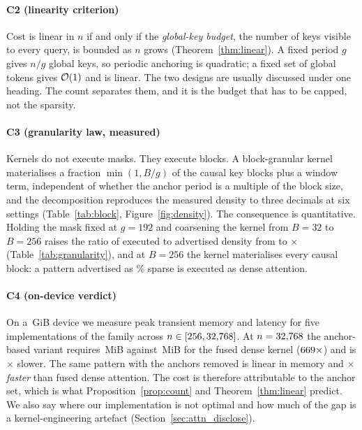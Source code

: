 \paragraph{C2 (linearity criterion)} Cost is linear in $n$ if and only if the
\emph{global-key budget}, the number of keys visible to every query, is bounded
as $n$ grows (Theorem~\ref{thm:linear}). A fixed period $g$ gives $n/g$ global
keys, so periodic anchoring is quadratic; a fixed set of global tokens gives
$\mathcal{O}(1)$ and is linear. The two designs are usually discussed under one
heading. The count separates them, and it is the budget that has to be capped,
not the sparsity.

\paragraph{C3 (granularity law, measured)} Kernels do not execute masks. They
execute blocks. A block-granular kernel materialises a fraction $\min(1, B/g)$ of
the causal key blocks plus a window term, independent of whether the anchor
period is a multiple of the block size, and the decomposition reproduces the
measured density to three decimals at six settings (Table~\ref{tab:block},
Figure~\ref{fig:density}). The consequence is quantitative. Holding the mask
fixed at $g=192$ and coarsening the kernel from $B=32$ to $B=256$ raises the
ratio of executed to advertised density from \BlockInflationGranMin{} to
\BlockInflationGranMax{}$\times$ (Table~\ref{tab:granularity}), and at $B=256$
the kernel materialises every causal block: a pattern advertised as
\BlockElemDensPct\% sparse is executed as dense attention.

\paragraph{C4 (on-device verdict)} On a \GpuMemGiB\,GiB device we measure peak
transient memory and latency for five implementations of the family across
$n\in[256, 32{,}768]$. At $n=32{,}768$ the anchor-based variant requires
\VramPswaBig\,MiB against \VramSdpaBig\,MiB for the fused dense kernel
($669\times$) and is \LatencySlowdownVsSdpa$\times$ slower. The same
pattern with the anchors removed is linear in memory and
\LatSlidingRatio$\times$ \emph{faster} than fused dense attention. The cost is
therefore attributable to the anchor set, which is what
Proposition~\ref{prop:count} and Theorem~\ref{thm:linear} predict. We also say
where our implementation is not optimal and how much of the gap is a
kernel-engineering artefact (Section~\ref{sec:attn_disclose}).

